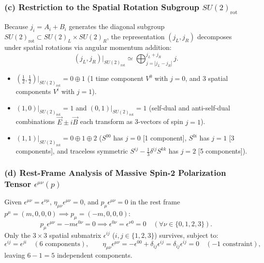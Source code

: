 \documentclass[11pt,a4paper]{article}
\begin{document}
\subsubsection*{(c) Restriction to the Spatial Rotation Subgroup $SU(2)_{\mathrm{rot}}$}
Because $j_i = A_i + B_i$ generates the diagonal subgroup $SU(2)_{\mathrm{rot}} \subset SU(2)_L \times SU(2)_R$, the representation $(j_L, j_R)$ decomposes under spatial rotations via angular momentum addition:
\begin{equation}
    (j_L, j_R)\big|_{SU(2)_{\mathrm{rot}}} \simeq \bigoplus_{j=|j_L - j_R|}^{j_L + j_R} j.
\end{equation}
\begin{itemize}
    \item $(\frac{1}{2}, \frac{1}{2})\big|_{SU(2)_{\mathrm{rot}}} = 0 \oplus 1$ (1 time component $V^0$ with $j=0$, and 3 spatial components $V^i$ with $j=1$).
    \item $(1,0)\big|_{SU(2)_{\mathrm{rot}}} = 1$ and $(0,1)\big|_{SU(2)_{\mathrm{rot}}} = 1$ (self-dual and anti-self-dual combinations $\vec{E} \pm i\vec{B}$ each transform as 3-vectors of spin $j=1$).
    \item $(1,1)\big|_{SU(2)_{\mathrm{rot}}} = 0 \oplus 1 \oplus 2$ ($S^{00}$ has $j=0$ [1 component], $S^{0i}$ has $j=1$ [3 components], and traceless symmetric $S^{ij} - \frac{1}{3}\delta^{ij}S^{kk}$ has $j=2$ [5 components]).
\end{itemize}

\subsubsection*{(d) Rest-Frame Analysis of Massive Spin-2 Polarization Tensor $\epsilon^{\mu\nu}(p)$}
Given $\epsilon^{\mu\nu} = \epsilon^{\nu\mu}$, $\eta_{\mu\nu}\epsilon^{\mu\nu} = 0$, and $p_\mu \epsilon^{\mu\nu} = 0$ in the rest frame $p^\mu = (m,0,0,0) \implies p_\mu = (-m,0,0,0)$:
\begin{equation}
    p_\mu \epsilon^{\mu\nu} = -m\epsilon^{0\nu} = 0 \implies \epsilon^{0\nu} = \epsilon^{\nu 0} = 0 \quad (\forall \nu \in \{0,1,2,3\}).
\end{equation}
Only the $3\times 3$ spatial submatrix $\epsilon^{ij}$ ($i,j \in \{1,2,3\}$) survives, subject to:
\begin{equation}
    \epsilon^{ij} = \epsilon^{ji} \quad (6\text{ components}), \qquad \eta_{\mu\nu}\epsilon^{\mu\nu} = -\epsilon^{00} + \delta_{ij}\epsilon^{ij} = \delta_{ij}\epsilon^{ij} = 0 \quad (-1\text{ constraint}),
\end{equation}
leaving $6 - 1 = 5$ independent components.
\end{document}

